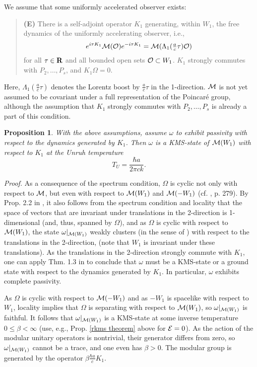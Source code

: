 \documentclass[a4paper,11pt]{article}
\newtheorem{proposition}[theorem]{Proposition}{\bf}{\it}
\def\dt{\cal}
\def\dM{{\dt M}}
\def\E{{\cal E}}
\def\O{{\cal O}}
\def\gO{\Omega}
\def\go{\omega}
\def\reals{{\bf R}}
\begin{document}
We assume that some uniformly accelerated observer exists:
\begin{quote}
{\bf (E)} There is a self-adjoint operator
$K_1$ generating, within $W_1$, the free dynamics of the uniformly
accelerating observer, i.e., $$e^{i\tau K_1}\dM(\O)e^{-i\tau
K_1}=\dM(\Lambda_1(\mbox{$\frac{a}{c}$}\tau)\O)$$ for all $\tau\in\reals$ and
all bounded open sets $\O\subset W_1$.
$K_1$ strongly commutes with $P_2,\dots,P_s$, and $K_1\gO=0$.
\end{quote}
Here, $\Lambda_1(\frac{a}{c}\tau)$ denotes the Lorentz boost by
$\frac{a}{c}\tau$ in the 1-direction.
$\dM$ is not yet assumed to be
covariant under a full representation of the Poincar\'e group,
although the assumption that $K_1$ strongly commutes with
$P_2,\dots,P_s$ is already a part of this condition.

\begin{proposition}%
With the above assumptions, assume $\go$ to exhibit passivity with respect
to the dynamics generated by $K_1$. Then $\go$
is a KMS-state of $\dM(W_1)$ with respect to $K_1$ at
the Unruh temperature
$$T_U=\frac{\hbar a}{2\pi ck}.$$
\end{proposition}

{\it Proof.} As a consequence of the spectrum
condition, $\gO$ is cyclic not only with respect to $\dM$, but even
with respect to $\dM(W_1)$ and $\dM(-W_1)$ (cf. \cite{Buc75}, p. 279).
By Prop. 2.2 in \cite{BF82}, it also
follows from the spectrum condition and locality that the space of
vectors that are invariant under translations in the 2-direction is
1-dimensional (and, thus, spanned by $\gO$), and as $\gO$ is cyclic
with respect to $\dM(W_1)$,
the state $\go|_{\dM(W_1)}$ weakly clusters (in the sense of \cite{PW78})
with respect to the translations in the 2-direction,
(note that $W_1$ is invariant under these translations).
As the translations in the 2-direction strongly commute with $K_1$, one
can apply Thm. 1.3 in \cite{PW78} to conclude that $\go$ must be a
KMS-state or a ground state with respect to the dynamics generated by
$K_1$. In particular, $\go$ exhibits complete passivity.

As $\gO$ is cyclic with respect to $\dM(-W_1)$ and as $-W_1$
is spacelike with respect to $W_1$, locality implies that
$\gO$ is separating with respect to $\dM(W_1)$, so $\go|_{\dM(W_1)}$
is faithful.
It follows that $\go|_{\dM(W_1)}$ is a KMS-state at some inverse temperature
$0\leq\beta<\infty$ (use, e.g., Prop. \ref{rkms theorem}
above for $\E=0$). As the action of the
modular unitary operators is nontrivial, their generator differs from
zero, so $\go|_{\dM(W_1)}$ cannot be a trace, and one even has
$\beta>0$. The modular group is generated by the operator
$\beta\frac{\hbar a}{c}K_1$.
\end{document}
